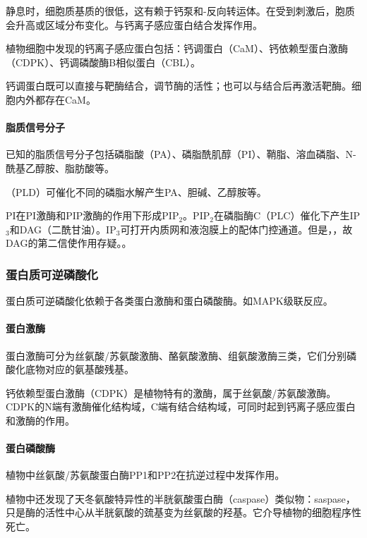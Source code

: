 静息时，细胞质基质的很低，这有赖于钙泵和-反向转运体。在受到刺激后，胞质会升高或区域分布变化。与钙离子感应蛋白结合发挥作用。

植物细胞中发现的钙离子感应蛋白包括：钙调蛋白（CaM）、钙依赖型蛋白激酶（CDPK）、钙调磷酸酶B相似蛋白（CBL）。

钙调蛋白既可以直接与靶酶结合，调节酶的活性；也可以与结合后再激活靶酶。细胞内外都存在CaM。

\paragraph{脂质信号分子}

已知的脂质信号分子包括磷脂酸（PA）、磷脂酰肌醇（PI）、鞘脂、溶血磷脂、N-酰基乙醇胺、脂肪酸等。

（PLD）可催化不同的磷脂水解产生PA、胆碱、乙醇胺等。

PI在PI激酶和PIP激酶的作用下形成PIP$_{2}$。PIP$_{2}$在磷脂酶C（PLC）催化下产生IP$_{3}$和DAG（二酰甘油）。IP$_{3}$可打开内质网和液泡膜上的配体门控通道。但是，，故DAG的第二信使作用存疑。。

\subsubsection{蛋白质可逆磷酸化}

蛋白质可逆磷酸化依赖于各类蛋白激酶和蛋白磷酸酶。如MAPK级联反应。

\paragraph{蛋白激酶}

蛋白激酶可分为丝氨酸/苏氨酸激酶、酪氨酸激酶、组氨酸激酶三类，它们分别磷酸化底物对应的氨基酸残基。

钙依赖型蛋白激酶（CDPK）是植物特有的激酶，属于丝氨酸/苏氨酸激酶。CDPK的N端有激酶催化结构域，C端有结合结构域，可同时起到钙离子感应蛋白和激酶的作用。

\paragraph{蛋白磷酸酶}

植物中丝氨酸/苏氨酸蛋白酶PP1和PP2在抗逆过程中发挥作用。

植物中还发现了天冬氨酸特异性的半胱氨酸蛋白酶（caspase）类似物：saspase，只是酶的活性中心从半胱氨酸的巯基变为丝氨酸的羟基。它介导植物的细胞程序性死亡。

